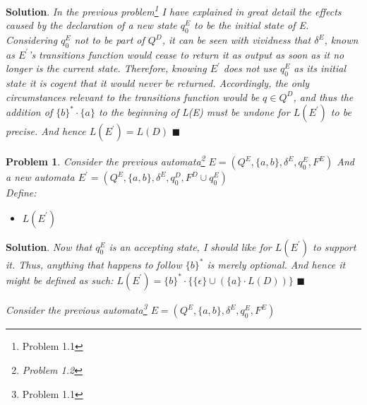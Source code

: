 \documentclass[12pt]{article}
\renewcommand{\=}[1]{\stackrel{#1}{=}} %
\newtheorem{p}{Problem}[section]
\theoremstyle{definition}
\newenvironment{s}{%
        \begin{trivlist} \item \textbf{Solution}. }{%
            \hspace*{\fill} $\blacksquare$\end{trivlist}}%
\begin{document}
\begin{s} \newline
  \emph{In the previous problem\footnote{Problem 1.1} I have explained in great detail the effects caused by the declaration of a new state $q_0^{E}$ to be the initial state of E. Considering $q_0^{E}$ not to be part of $Q^{D}$, it can be seen with vividness that $\delta^{E}$, known as $E^{\prime}$'s transitions function would cease to return it as output as soon as it no longer is the current state. Therefore, knowing $E^{\prime}$ does not use $q_0^{E}$ as its initial state it is cogent that it would never be returned. Accordingly, the only circumstances relevant to the transitions function would be $q \in Q^{D}$, and thus the addition of $\{b\}^{*} \cdot \{a\}$ to the beginning of L(E) must be undone for $L(E^{\prime})$ to be precise. And hence $L(E^{\prime}) = L(D)$}
\end{s}
\begin{p}
  \emph{\newline Consider the previous automata\footnote{Problem 1.2} $E = (Q^{E}, \{a,b\}, \delta^{E}, q_0^{E}, F^{E})$} \newline
  \emph{And a new automata $E^{\prime} = (Q^{E}, \{a,b\}, \delta^{E}, q_0^{D}, F^{D} \cup q_0^{E})$} \newline
  \\
  Define: 
  \begin{itemize}
    \item $L(E^{\prime})$
  \end{itemize}
\end{p}
\begin{s} \newline
  \emph{Now that $q_0^{E}$ is an accepting state, I should like for $L(E^{\prime})$ to support it. Thus, anything that happens to follow $\{b\}^{*}$ is merely optional. And hence it might be defined as such: $L(E^{\prime}) = \{b\}^{*} \cdot \{\{\epsilon\} \cup (\{a\} \cdot L(D))\}$} 
\end{s}
  \emph{\newline Consider the previous automata\footnote{Problem 1.1} $E = (Q^{E}, \{a,b\}, \delta^{E}, q_0^{E}, F^{E})$} \newline
\newpage
\end{document}

